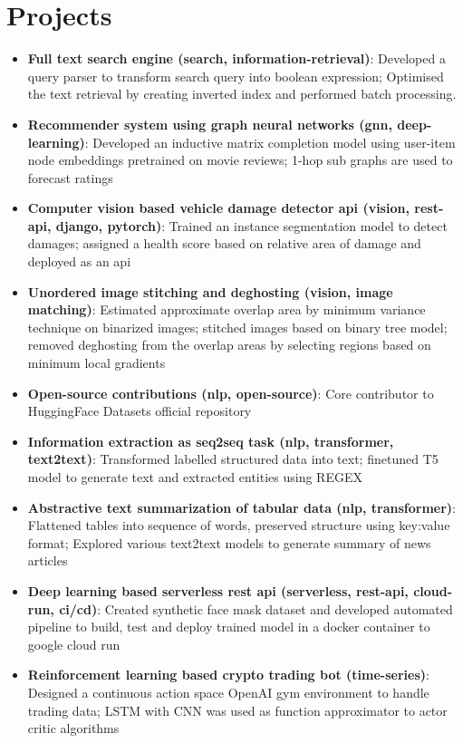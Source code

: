 \documentclass[a4paper,20pt]{article}
\newcommand{\resumeItem}[2]{
  \item\small{
    \textbf{#1}{: #2 \vspace{-2pt}}
  }
}
\newcommand{\resumeSubItem}[2]{\resumeItem{#1}{#2}\vspace{-3pt}}
\newcommand{\resumeSubHeadingListStart}{\begin{itemize}[leftmargin=*]}
\newcommand{\resumeSubHeadingListEnd}{\end{itemize}}
\begin{document}
\section{Projects}
\resumeSubHeadingListStart
\resumeSubItem{Full text search engine (search, information-retrieval)}{Developed a query parser to transform search query into boolean expression; Optimised the text retrieval by creating inverted index and performed batch processing.}
\vspace{2pt}
\resumeSubItem{Recommender system using graph neural networks (gnn, deep-learning)}{Developed an inductive matrix completion model using user-item node embeddings pretrained on movie reviews; 1-hop sub graphs are used to forecast ratings}
\vspace{2pt}
\resumeSubItem{Computer vision based vehicle damage detector api (vision, rest-api, django, pytorch)}{Trained an instance segmentation model to detect damages; assigned a health score based on relative area of damage and deployed as an api}
\vspace{2pt}
\resumeSubItem{Unordered image stitching and deghosting (vision, image matching)}{Estimated approximate overlap area by minimum variance technique on binarized images; stitched images based on binary tree model; removed deghosting from the overlap areas by selecting regions based on minimum local gradients}
\vspace{2pt}
\resumeSubItem{Open-source contributions (nlp, open-source)}{Core contributor to HuggingFace Datasets official repository}
\vspace{2pt}
\resumeSubItem{Information extraction as seq2seq task (nlp, transformer, text2text)}{Transformed labelled structured data into text; finetuned T5 model to generate text and extracted entities using REGEX}
\vspace{2pt}
\resumeSubItem{Abstractive text summarization of tabular data (nlp, transformer)}{Flattened tables into sequence of words, preserved structure using key:value format; Explored various text2text models to generate summary of news articles}
\vspace{2pt}
\resumeSubItem{Deep learning based serverless rest api (serverless, rest-api, cloud-run, ci/cd)}{Created synthetic face mask dataset and developed automated pipeline to build, test and deploy trained model in a docker container to google cloud run}
\vspace{2pt}
\resumeSubItem{Reinforcement learning based crypto trading bot (time-series)}{Designed a continuous action space OpenAI gym environment to handle trading data; LSTM with CNN was used as function approximator to actor critic algorithms}
\resumeSubHeadingListEnd
\vspace{-5pt}
\end{document}
